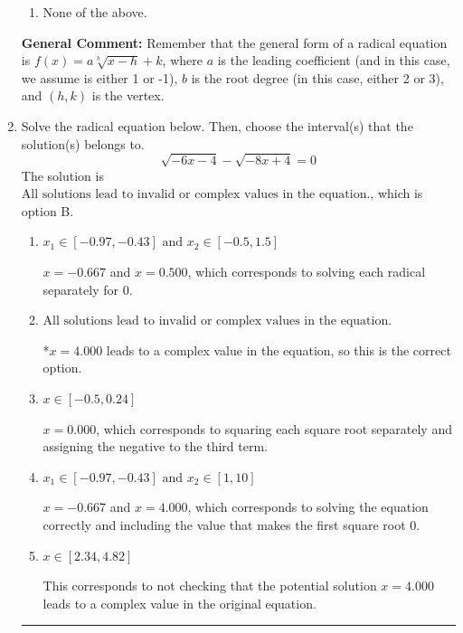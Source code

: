 \documentclass{extbook}[14pt]
\newcommand{\litem}[1]{\item #1

\rule{\textwidth}{0.4pt}}
\begin{document}
\begin{enumerate}
{\begin{enumerate}[label=\Alph*.]
\item None of the above.\end{enumerate}
\textbf{General Comment:} Remember that the general form of a radical equation is $ f(x) = a \sqrt[b]{x - h} + k $, where $a$ is the leading coefficient (and in this case, we assume is either 1 or -1), $b$ is the root degree (in this case, either 2 or 3), and $(h, k)$ is the vertex.
}
\litem{
Solve the radical equation below. Then, choose the interval(s) that the solution(s) belongs to.
\[ \sqrt{-6 x - 4} - \sqrt{-8 x + 4} = 0 \]The solution is \( \text{All solutions lead to invalid or complex values in the equation.} \), which is option B.\begin{enumerate}[label=\Alph*.]
\item \( x_1 \in [-0.97, -0.43] \text{ and } x_2 \in [-0.5,1.5] \)

$x = -0.667$ and $x = 0.500$, which corresponds to solving each radical separately for 0.
\item \( \text{All solutions lead to invalid or complex values in the equation.} \)

*$x = 4.000$ leads to a complex value in the equation, so this is the correct option.
\item \( x \in [-0.5,0.24] \)

$x = 0.000$, which corresponds to squaring each square root separately and assigning the negative to the third term.
\item \( x_1 \in [-0.97, -0.43] \text{ and } x_2 \in [1,10] \)

$x = -0.667$ and $x = 4.000$, which corresponds to solving the equation correctly and including the value that makes the first square root 0.
\item \( x \in [2.34,4.82] \)

This corresponds to not checking that the potential solution $x = 4.000$ leads to a complex value in the original equation.
\end{enumerate}

}
\end{enumerate}
\end{document}
